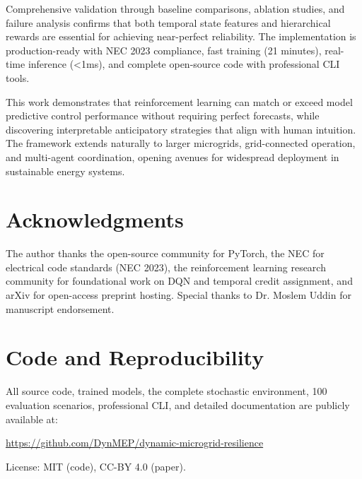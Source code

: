 \documentclass[11pt,a4paper]{article}
\begin{document}
Comprehensive validation through baseline comparisons, ablation studies, and failure analysis confirms that both temporal state features and hierarchical rewards are essential for achieving near-perfect reliability. The implementation is production-ready with NEC 2023 compliance, fast training (21 minutes), real-time inference (<1ms), and complete open-source code with professional CLI tools.

This work demonstrates that reinforcement learning can match or exceed model predictive control performance without requiring perfect forecasts, while discovering interpretable anticipatory strategies that align with human intuition. The framework extends naturally to larger microgrids, grid-connected operation, and multi-agent coordination, opening avenues for widespread deployment in sustainable energy systems.

\section*{Acknowledgments}

The author thanks the open-source community for PyTorch, the NEC for electrical code standards (NEC 2023), the reinforcement learning research community for foundational work on DQN and temporal credit assignment, and arXiv for open-access preprint hosting. Special thanks to Dr. Moslem Uddin for manuscript endorsement.

\section*{Code and Reproducibility}
All source code, trained models, the complete stochastic environment, 100 evaluation scenarios, professional CLI, and detailed documentation are publicly available at:
\begin{center}
\url{https://github.com/DynMEP/dynamic-microgrid-resilience}
\end{center}
License: MIT (code), CC-BY 4.0 (paper).
\end{document}
